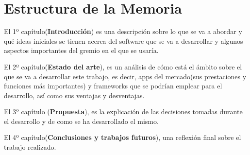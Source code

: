 \section{Estructura de la Memoria}

El 1º capítulo(\textbf{Introducción}) es una descripción sobre lo que se va a abordar y qué ideas iniciales se tienen acerca del software que se va a desarrollar y algunos aspectos importantes del gremio en el que se usaría.

El 2º capítulo(\textbf{Estado del arte}), es un análisis de cómo está el ámbito sobre el que se va a desarrollar este trabajo, es decir, apps del mercado(sus prestaciones y funciones más importantes) y frameworks que se podrían emplear para el desarrollo, así como sus ventajas y desventajas.  %

El 3º capítulo (\textbf{Propuesta}), es la explicación de las decisiones tomadas durante el desarrollo y de como se ha desarrollado el mismo.

El 4º capítulo(\textbf{Conclusiones y trabajos futuros}), una reflexión final sobre el trabajo realizado.
